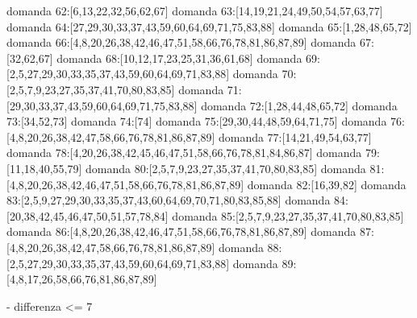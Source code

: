 domanda 62:[6,13,22,32,56,62,67]
domanda 63:[14,19,21,24,49,50,54,57,63,77]
domanda 64:[27,29,30,33,37,43,59,60,64,69,71,75,83,88]
domanda 65:[1,28,48,65,72]
domanda 66:[4,8,20,26,38,42,46,47,51,58,66,76,78,81,86,87,89]
domanda 67:[32,62,67]
domanda 68:[10,12,17,23,25,31,36,61,68]
domanda 69:[2,5,27,29,30,33,35,37,43,59,60,64,69,71,83,88]
domanda 70:[2,5,7,9,23,27,35,37,41,70,80,83,85]
domanda 71:[29,30,33,37,43,59,60,64,69,71,75,83,88]
domanda 72:[1,28,44,48,65,72]
domanda 73:[34,52,73]
domanda 74:[74]
domanda 75:[29,30,44,48,59,64,71,75]
domanda 76:[4,8,20,26,38,42,47,58,66,76,78,81,86,87,89]
domanda 77:[14,21,49,54,63,77]
domanda 78:[4,20,26,38,42,45,46,47,51,58,66,76,78,81,84,86,87]
domanda 79:[11,18,40,55,79]
domanda 80:[2,5,7,9,23,27,35,37,41,70,80,83,85]
domanda 81:[4,8,20,26,38,42,46,47,51,58,66,76,78,81,86,87,89]
domanda 82:[16,39,82]
domanda 83:[2,5,9,27,29,30,33,35,37,43,60,64,69,70,71,80,83,85,88]
domanda 84:[20,38,42,45,46,47,50,51,57,78,84]
domanda 85:[2,5,7,9,23,27,35,37,41,70,80,83,85]
domanda 86:[4,8,20,26,38,42,46,47,51,58,66,76,78,81,86,87,89]
domanda 87:[4,8,20,26,38,42,47,58,66,76,78,81,86,87,89]
domanda 88:[2,5,27,29,30,33,35,37,43,59,60,64,69,71,83,88]
domanda 89:[4,8,17,26,58,66,76,81,86,87,89]


- differenza <= 7

